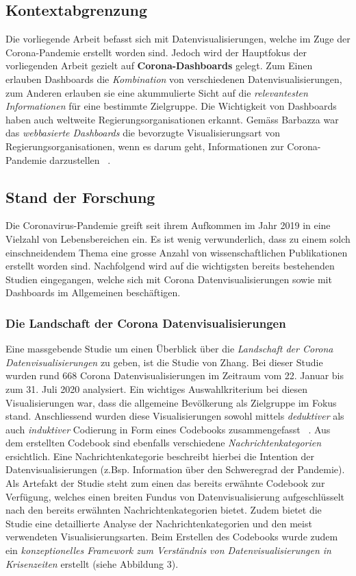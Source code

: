 \documentclass[12pt, oneside]{article}
\begin{document}
\subsection{Kontextabgrenzung}
Die vorliegende Arbeit befasst sich mit Datenvisualisierungen, welche im Zuge der Corona-Pandemie erstellt worden sind. Jedoch wird der Hauptfokus der vorliegenden Arbeit gezielt auf \textbf{Corona-Dashboards} gelegt. Zum Einen erlauben Dashboards die \textit{Kombination} von verschiedenen Datenvisualisierungen, zum Anderen erlauben sie eine akummulierte Sicht auf die \textit{relevantesten Informationen} für eine bestimmte Zielgruppe. Die Wichtigkeit von Dashboards haben auch weltweite Regierungsorganisationen erkannt. Gemäss Barbazza war das \textit{webbasierte Dashboards} die bevorzugte Visualisierungsart von Regierungsorganisationen, wenn es darum geht, Informationen zur Corona-Pandemie darzustellen ~\citep{Barbazza.}.

\subsection{Stand der Forschung}
 Die Coronavirus-Pandemie greift seit ihrem Aufkommen im Jahr 2019 in eine Vielzahl von Lebensbereichen ein. Es ist wenig verwunderlich, dass zu einem solch einschneidendem Thema eine grosse Anzahl von wissenschaftlichen Publikationen erstellt worden sind. Nachfolgend wird auf die wichtigsten bereits bestehenden Studien eingegangen, welche sich mit Corona Datenvisualisierungen sowie mit Dashboards im Allgemeinen beschäftigen.
 
 \subsubsection{Die Landschaft der Corona Datenvisualisierungen}
 Eine massgebende Studie um einen Überblick über die \textit{Landschaft der Corona Datenvisualisierungen} zu geben, ist die Studie von Zhang. Bei dieser Studie wurden rund 668 Corona Datenvisualisierungen im Zeitraum vom 22. Januar bis zum 31. Juli 2020 analysiert. Ein wichtiges Auswahlkriterium bei diesen Visualisierungen war, dass die allgemeine Bevölkerung als Zielgruppe im Fokus stand. Anschliessend wurden diese Visualisierungen sowohl mittels \textit{deduktiver} als auch \textit{induktiver} Codierung in Form eines Codebooks zusammengefasst ~\citep[S. 3]{YixuanZhang.}. Aus dem erstellten Codebook sind ebenfalls verschiedene \textit{Nachrichtenkategorien} ersichtlich. Eine Nachrichtenkategorie beschreibt hierbei die Intention der Datenvisualisierungen (z.Bsp. Information über den Schweregrad der Pandemie). Als Artefakt der Studie steht zum einen das bereits erwähnte Codebook zur Verfügung, welches einen breiten Fundus von Datenvisualisierung aufgeschlüsselt nach den bereits erwähnten Nachrichtenkategorien bietet. Zudem bietet die Studie eine detaillierte Analyse der Nachrichtenkategorien und den meist verwendeten Visualisierungsarten. Beim Erstellen des Codebooks wurde zudem ein \textit{konzeptionelles Framework zum Verständnis von Datenvisualisierungen in Krisenzeiten} erstellt (siehe Abbildung 3). 
 
\end{document}
